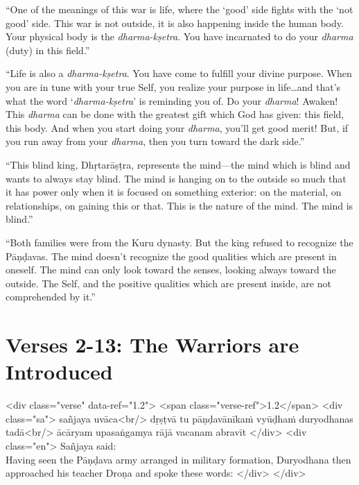 \enquote{One of the meanings of this war is life, where the \enquote{good} side fights with the \enquote{not good} side. This war is not outside, it is also happening inside the human body. Your physical body is the \textit{dharma-kṣetra}. You have incarnated to do your \textit{dharma} (duty) in this field.}

\enquote{Life is also a \textit{dharma-kṣetra}. You have come to fulfill your divine purpose. When you are in tune with your true Self, you realize your purpose in life\ldots and that’s what the word \enquote{\textit{dharma-kṣetra}} is reminding you of. Do your \textit{dharma}! Awaken! This \textit{dharma} can be done with the greatest gift which God has given: this field, this body. And when you start doing your \textit{dharma}, you’ll get good merit! But, if you run away from your \textit{dharma}, then you turn toward the dark side.}

\enquote{This blind king, Dhṛtarāṣṭra, represents the mind---the mind which is blind and wants to always stay blind. The mind is hanging on to the outside so much that it has power only when it is focused on something exterior: on the material, on relationships, on gaining this or that. This is the nature of the mind. The mind is blind.}

\enquote{Both families were from the Kuru dynasty. But the king refused to recognize the Pāṇḍavas. The mind doesn’t recognize the good qualities which are present in oneself. The mind can only look toward the senses, looking always toward the outside. The Self, and the positive qualities which are present inside, are not comprehended by it.}

\section{Verses 2-13: The Warriors are Introduced}\label{sec-verses-2-13-the-warriors-are-introduced}



\begin{html}
<div class="verse" data-ref="1.2">
  <span class="verse-ref">1.2</span>
  <div class="sa">
    sañjaya uvāca<br/>
    dṛṣṭvā tu pāṇḍavānīkaṁ vyūḍhaṁ duryodhanas tadā<br/>
    ācāryam upasaṅgamya rājā vacanam abravīt
  </div>
  <div class="en">
    \hspace*{1em}Sañjaya said: \\ Having seen the Pāṇḍava army arranged in military formation, Duryodhana then approached his teacher Droṇa and spoke these words:
  </div>
</div>
\end{html}




